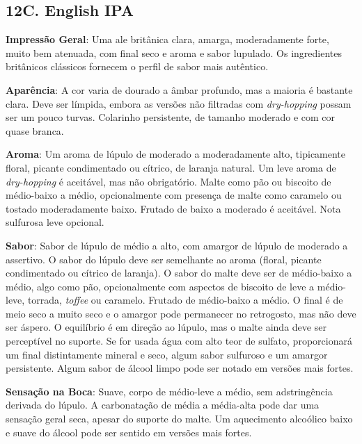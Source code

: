\subsection*{12C. English IPA}
\textbf{Impressão Geral}: Uma ale britânica clara, amarga, moderadamente forte, muito bem atenuada, com final seco e aroma e sabor lupulado. Os ingredientes britânicos clássicos fornecem o perfil de sabor mais autêntico.

\textbf{Aparência}: A cor varia de dourado a âmbar profundo, mas a maioria é bastante clara. Deve ser límpida, embora as versões não filtradas com \textit{dry-hopping} possam ser um pouco turvas. Colarinho persistente, de tamanho moderado e com cor quase branca.

\textbf{Aroma}: Um aroma de lúpulo de moderado a moderadamente alto, tipicamente floral, picante condimentado ou cítrico, de laranja natural. Um leve aroma de \textit{dry-hopping} é aceitável, mas não obrigatório. Malte como pão ou biscoito de médio-baixo a médio, opcionalmente com presença de malte como caramelo ou tostado moderadamente baixo. Frutado de baixo a moderado é aceitável. Nota sulfurosa leve opcional.

\textbf{Sabor}: Sabor de lúpulo de médio a alto, com amargor de lúpulo de moderado a assertivo. O sabor do lúpulo deve ser semelhante ao aroma (floral, picante condimentado ou cítrico de laranja). O sabor do malte deve ser de médio-baixo a médio, algo como pão, opcionalmente com aspectos de biscoito de leve a médio-leve, torrada, \textit{toffee} ou caramelo. Frutado de médio-baixo a médio. O final é de meio seco a muito seco e o amargor pode permanecer no retrogosto, mas não deve ser áspero. O equilíbrio é em direção ao lúpulo, mas o malte ainda deve ser perceptível no suporte. Se for usada água com alto teor de sulfato, proporcionará um final distintamente mineral e seco, algum sabor sulfuroso e um amargor persistente. Algum sabor de álcool limpo pode ser notado em versões mais fortes.

\textbf{Sensação na Boca}: Suave, corpo de médio-leve a médio, sem adstringência derivada do lúpulo. A carbonatação de média a média-alta pode dar uma sensação geral seca, apesar do suporte do malte. Um aquecimento alcoólico baixo e suave do álcool pode ser sentido em versões mais fortes.

